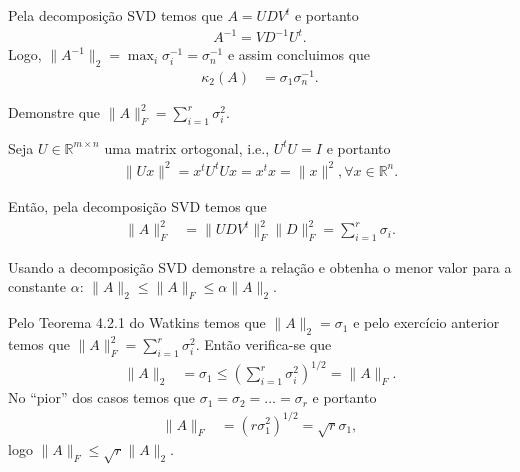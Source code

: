 \documentclass[a4paper,12pt, leqno, answers]{exam}
\begin{document}
\begin{questions}
\begin{solution}
        Pela decomposi\c{c}\~{a}o SVD temos que $A = U D V^t$ e portanto
        \begin{align*}
            A^{-1} = V D^{-1} U^t.
        \end{align*}
        Logo, $\| A^{-1} \|_2 = \max_i \sigma_i^{-1} = \sigma_n^{-1}$ e assim concluimos que
        \begin{align*}
            \kappa_2(A) &= \sigma_1 \sigma_n^{-1}.
        \end{align*}
    \end{solution}

     Demonstre que $\| A \|_F^2 = \sum_{i = 1}^r \sigma_i^2$.
    \begin{solution}
        Seja $U \in \mathbb{R}^{m \times n}$ uma matrix ortogonal, i.e., $U^t U = I$ e portanto
        \begin{align*}
            \| U x \|^2 = x^t U^t U x = x^t x = \| x \|^2, \forall x \in \mathbb{R}^n.
        \end{align*}

        Ent\~{a}o, pela decomposi\c{c}\~{a}o SVD temos que
        \begin{align*}
            \| A \|_F^2 &= \| U D V^t \|_F^2 \| D \|_F^2 = \sum_{i = 1}^r \sigma_i.
        \end{align*}
    \end{solution}

    \question Usando a decomposi\c{c}\~{a}o SVD demonstre a rela\c{c}\~{a}o e obtenha o menor valor para a constante $\alpha$: $\| A \|_2 \leq \| A \|_F \leq \alpha \| A \|_2$.
    \begin{solution}
        Pelo Teorema 4.2.1 do Watkins\nocite{Watkins:2004:fundamentals} temos que $\| A \|_2 = \sigma_1$ e pelo exerc\'{i}cio anterior temos que $\| A \|_F^2 = \sum_{i = 1}^r \sigma_i^2$. Ent\~{a}o verifica-se que
        \begin{align*}
            \| A \|_2 &= \sigma_1 \leq \left( \sum_{i = 1}^r \sigma_i^2 \right)^{1/2} = \| A \|_F.
        \end{align*}
        No ``pior'' dos casos temos que $\sigma_1 = \sigma_2 = \ldots = \sigma_r$ e portanto
        \begin{align*}
            \| A \|_F &= \left( r \sigma_1^2 \right)^{1/2} = \sqrt{r} \sigma_1,
        \end{align*}
        logo $\| A \|_F \leq \sqrt{r} \| A \|_2$.
    \end{solution}


\end{questions}
\end{document}
